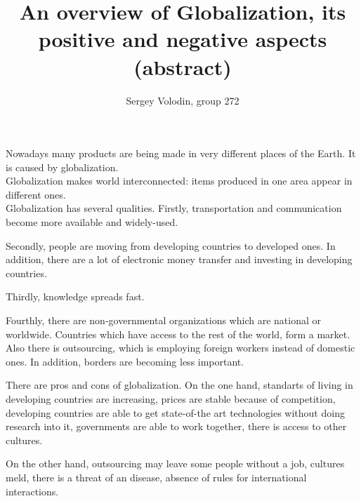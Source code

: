 \documentclass[a4paper]{article}
\author{Sergey Volodin, group 272}
\title{An overview of Globalization, its positive and negative aspects\\(abstract)}
\begin{document}
\maketitle
Nowadays many products are being made in very different places of the Earth. It is caused by globalization.
\\[5pt]
Globalization makes world interconnected: items produced in one area appear in different ones. 
\\[1pt]
Globalization has several qualities. Firstly, transportation and communication become more available and widely-used.

Secondly, people are moving from developing countries to developed ones. In addition, there are a lot of electronic money transfer and investing in developing countries.

Thirdly, knowledge spreads fast.

Fourthly, there are non-governmental organizations which are national or worldwide. Countries which have access to the rest of the world, form a market. Also there is outsourcing, which is employing foreign workers instead of domestic ones. In addition, borders are becoming less important.

There are pros and cons of globalization. On the one hand, standarts of living in developing countries are increasing, prices are stable because of competition, developing countries are able to get state-of-the art technologies without doing research into it, governments are able to work together, there is access to other cultures.

On the other hand, outsourcing may leave some people without a job, cultures meld, there is a threat of an disease, absence of rules for international interactions.
\end{document}
